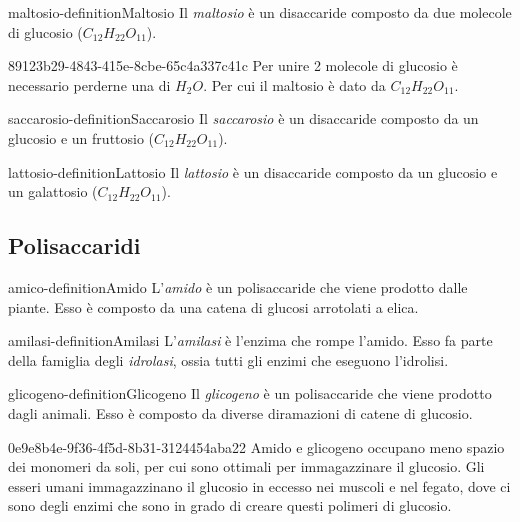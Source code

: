 \documentclass[preview]{standalone}
\begin{document}
\begin{snippetdefinition}{maltosio-definition}{Maltosio}
    Il \textit{maltosio} è un disaccaride composto da due molecole di glucosio (\(C_{12}H_{22}O_{11}\)).
\end{snippetdefinition}

\begin{snippet}{89123b29-4843-415e-8cbe-65c4a337c41c}
    Per unire 2 molecole di glucosio è necessario perderne una di \(H_2O\).
    Per cui il maltosio è dato da \(C_{12}H_{22}O_{11}\).
\end{snippet}

\begin{snippetdefinition}{saccarosio-definition}{Saccarosio}
    Il \textit{saccarosio} è un disaccaride composto da un glucosio e un fruttosio (\(C_{12}H_{22}O_{11}\)).
\end{snippetdefinition}

\begin{snippetdefinition}{lattosio-definition}{Lattosio}
    Il \textit{lattosio} è un disaccaride composto da un glucosio e un galattosio (\(C_{12}H_{22}O_{11}\)).
\end{snippetdefinition}

\subsection{Polisaccaridi}

\begin{snippetdefinition}{amico-definition}{Amido}
    L'\textit{amido} è un polisaccaride che viene prodotto dalle piante.
    Esso è composto da una catena di glucosi arrotolati a elica.
\end{snippetdefinition}

\begin{snippetdefinition}{amilasi-definition}{Amilasi}
    L'\textit{amilasi} è l'enzima che rompe l'amido.
    Esso fa parte della famiglia degli \textit{idrolasi}, ossia tutti gli enzimi che
    eseguono l'idrolisi.
\end{snippetdefinition}

\begin{snippetdefinition}{glicogeno-definition}{Glicogeno}
    Il \textit{glicogeno} è un polisaccaride che viene prodotto dagli animali.
    Esso è composto da diverse diramazioni di catene di glucosio.
\end{snippetdefinition}

\begin{snippet}{0e9e8b4e-9f36-4f5d-8b31-3124454aba22}
    Amido e glicogeno occupano meno spazio dei monomeri da soli, per cui sono ottimali per immagazzinare
    il glucosio.
    Gli esseri umani immagazzinano il glucosio in eccesso nei muscoli e nel fegato, dove ci sono degli enzimi
    che sono in grado di creare questi polimeri di glucosio.
\end{snippet}
\end{document}

